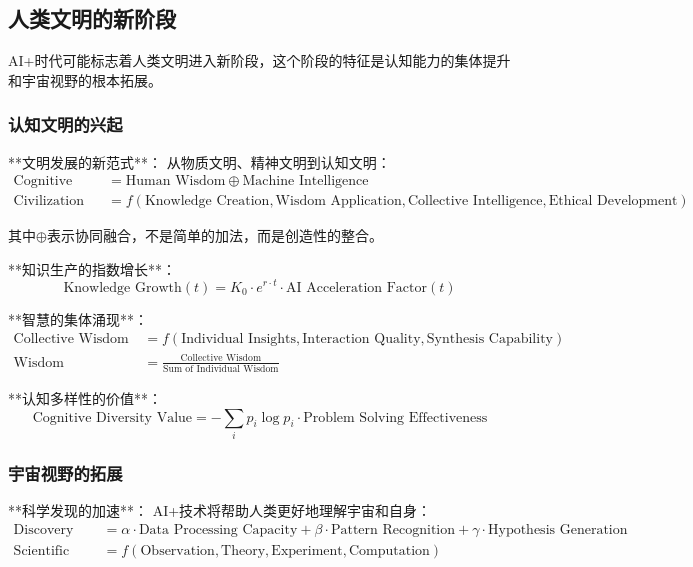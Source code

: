 \subsection{人类文明的新阶段}

AI+时代可能标志着人类文明进入新阶段，这个阶段的特征是认知能力的集体提升和宇宙视野的根本拓展。

\subsubsection{认知文明的兴起} %

**文明发展的新范式**：
从物质文明、精神文明到认知文明：
\begin{align}
\text{Cognitive Civilization} &= \text{Human Wisdom} \oplus \text{Machine Intelligence} \\
\text{Civilization Index} &= f(\text{Knowledge Creation}, \text{Wisdom Application}, \text{Collective Intelligence}, \text{Ethical Development})
\end{align}

其中$\oplus$表示协同融合，不是简单的加法，而是创造性的整合。

**知识生产的指数增长**：
\begin{equation}
\text{Knowledge Growth}(t) = K_0 \cdot e^{r \cdot t} \cdot \text{AI Acceleration Factor}(t)
\end{equation}

**智慧的集体涌现**：
\begin{align}
\text{Collective Wisdom} &= f(\text{Individual Insights}, \text{Interaction Quality}, \text{Synthesis Capability}) \\
\text{Wisdom Amplification} &= \frac{\text{Collective Wisdom}}{\text{Sum of Individual Wisdom}}
\end{align}

**认知多样性的价值**：
\begin{equation}
\text{Cognitive Diversity Value} = -\sum_{i} p_i \log p_i \cdot \text{Problem Solving Effectiveness}
\end{equation}

\subsubsection{宇宙视野的拓展} %

**科学发现的加速**：
AI+技术将帮助人类更好地理解宇宙和自身：
\begin{align}
\text{Discovery Rate} &= \alpha \cdot \text{Data Processing Capacity} + \beta \cdot \text{Pattern Recognition} + \gamma \cdot \text{Hypothesis Generation} \\
\text{Scientific Progress} &= f(\text{Observation}, \text{Theory}, \text{Experiment}, \text{Computation})
\end{align}

